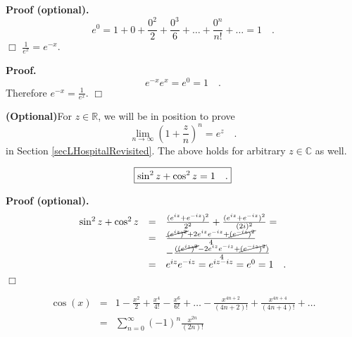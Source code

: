 \documentclass[12pt]{book}
\newcommand{\importantFormula}[1]{\begin{equation} \boxed{#1} \end{equation}}
\newenvironment{proof}[1][]{ \textbf{Proof#1.} }{$\Box$\medskip}
\newenvironment{proofOptional}[1][]{ \textbf{Proof (optional).}}{$\Box$\medskip}
\newcommand{\optionalMaterial}{\textbf{(Optional)}}
\begin{document}
\begin{proofOptional}
\[ e^0 = 1+ 0+ \frac{0^2}{2}+ \frac{0^3}{6}+\dots +\frac{0^n}{n!}+\dots = 1\quad .
\]
\end{proofOptional}
$\frac{1}{e^{x}}= e^{-x}$\quad .

\begin{proof}
\[e^{-x}e^x=e^0 = 1\quad .
\]
Therefore $e^{-x}=\frac{1}{e^x}.$
\end{proof}

\optionalMaterial For $z\in \mathbb R$, we will be in position to prove  
\begin{equation}\label{eq(1+x/n)^n=e^x}
\lim_{n\to \infty} \left(1+\frac{z}n\right)^n= e^z\quad .
\end{equation}
in Section \ref{secLHospitalRevisited}. The above holds for arbitrary $z\in \mathbb C$ as well.

\importantFormula{\label{eqsinSquaredPlusCosSquared}
\sin^2 z +\cos^2 z= 1\quad .
}


\begin{proofOptional}
\begin{equation*}
\begin{array}{rcl}
\sin^2 z +\cos^2 z&=& \frac{(e^{iz}+e^{-iz})^2}{2^2}+\frac{(e^{iz}+e^{-iz})^2}{(2i)^2}=\\
&=&\frac{ \cancel{(e^{iz})^2} + 2 e^{iz}e^{-iz} + \cancel{(e^{-iz})^2}}{4} \\
&&-\frac{(\cancel{(e^{iz})^2}-2e^{iz}e^{-iz} + \cancel{(e^{-iz})^2})}{4} \\&=& e^{iz}e^{-iz}= e^{iz-iz}=e^0=1\quad .
\end{array}
\end{equation*}
\end{proofOptional}

\begin{equation}\label{eqcosPowerSeries} 
\begin{array}{rcl}
\cos(x)&=&1-\frac{x^2}{2}+\frac{x^4}{4!}-\frac{x^6}{6!}+\dots -\frac{x^{4n+2}}{(4n+2)!}+ \frac{x^{4n+4}}{(4n+4)!}+\dots\\
&=&\displaystyle \sum_{n=0}^\infty (-1)^n\frac{x^{2n}}{(2n)!}
\end{array}
\end{equation}
\end{document}
